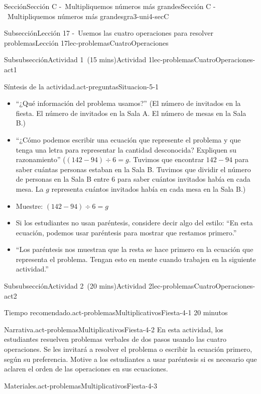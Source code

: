 \documentclass[oneside,10pt,]{article}
\begin{document}
\begin{sectionptx}{Sección}{Sección C -~Multipliquemos números más grandes}{}{Sección C -~Multipliquemos números más grandes}{}{}{gra3-uni4-secC}
\begin{subsectionptx}{Subsección}{Lección 17 -~Usemos las cuatro operaciones para resolver problemas}{}{Lección 17}{}{}{lec-problemasCuatroOperaciones}
\begin{subsubsectionptx}{Subsubsección}{Actividad 1~(15 mins)}{}{Actividad 1}{}{}{lec-problemasCuatroOperaciones-act1}
\begin{paragraphs}{Síntesis de la actividad.}{act-preguntasSituacion-5-1}
%
\begin{itemize}[label=\textbullet]
\item{}``¿Qué información del problema usamos?'' (El número de invitados en la fiesta. El número de invitados en la Sala A. El número de mesas en la Sala B.)%
\item{}``¿Cómo podemos escribir una ecuación que represente el problema y que tenga una letra para representar la cantidad desconocida? Expliquen su razonamiento'' (\((142 - 94) \div 6 = g\). Tuvimos que encontrar \(142 - 94\) para saber cuántas personas estaban en la Sala B. Tuvimos que dividir el número de personas en la Sala B entre 6 para saber cuántos invitados había en cada mesa. La \(g\) representa cuántos invitados había en cada mesa en la Sala B.)%
\item{}Muestre: \((142 - 94) \div 6 = g\)%
\item{}Si los estudiantes no usan paréntesis, considere decir algo del estilo: ``En esta ecuación, podemos usar paréntesis para mostrar que restamos primero.''%
\item{}``Los paréntesis nos muestran que la resta se hace primero en la ecuación que representa el problema. Tengan esto en mente cuando trabajen en la siguiente actividad.''%
\end{itemize}
\end{paragraphs}%
\end{subsubsectionptx}
%
%
\typeout{************************************************}
\typeout{************************************************}
%
\begin{subsubsectionptx}{Subsubsección}{Actividad 2~(20 mins)}{}{Actividad 2}{}{}{lec-problemasCuatroOperaciones-act2}
\par
\begin{paragraphs}{Tiempo recomendado.}{act-problemasMultiplicativosFiesta-4-1}%
20 minutos%
\end{paragraphs}%
\begin{paragraphs}{Narrativa.}{act-problemasMultiplicativosFiesta-4-2}%
En esta actividad, los estudiantes resuelven problemas verbales de dos pasos usando las cuatro operaciones. Se les invitará a resolver el problema o escribir la ecuación primero, según su preferencia. Motive a los estudiantes a usar paréntesis si es necesario que aclaren el orden de las operaciones en sus ecuaciones.%
\end{paragraphs}%
\begin{paragraphs}{Materiales.}{act-problemasMultiplicativosFiesta-4-3}%

\end{paragraphs}
\end{subsubsectionptx}
\end{subsectionptx}
\end{sectionptx}
\end{document}
